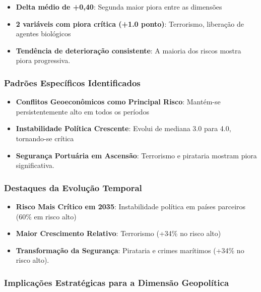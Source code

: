\documentclass[
  portuguese,
  letterpaper,
  DIV=11,
  numbers=noendperiod]{scrreprt}
\providecommand{\tightlist}{%
  \setlength{\itemsep}{0pt}\setlength{\parskip}{0pt}}
\begin{document}
\begin{itemize}
\tightlist
\item
  \textbf{Delta médio de +0,40}: Segunda maior piora entre as dimensões
\item
  \textbf{2 variáveis com piora crítica (+1.0 ponto)}: Terrorismo,
  liberação de agentes biológicos
\item
  \textbf{Tendência de deterioração consistente}: A maioria dos riscos
  mostra piora progressiva.
\end{itemize}

\subsubsection{Padrões Específicos
Identificados}\label{padruxf5es-especuxedficos-identificados-3}

\begin{itemize}
\tightlist
\item
  \textbf{Conflitos Geoeconômicos como Principal Risco}: Mantém-se
  persistentemente alto em todos os períodos
\item
  \textbf{Instabilidade Política Crescente}: Evolui de mediana 3.0 para
  4.0, tornando-se crítica
\item
  \textbf{Segurança Portuária em Ascensão}: Terrorismo e pirataria
  mostram piora significativa.
\end{itemize}

\subsubsection{Destaques da Evolução
Temporal}\label{destaques-da-evoluuxe7uxe3o-temporal-2}

\begin{itemize}
\tightlist
\item
  \textbf{Risco Mais Crítico em 2035}: Instabilidade política em países
  parceiros (60\% em risco alto)
\item
  \textbf{Maior Crescimento Relativo}: Terrorismo (+34\% no risco alto)
\item
  \textbf{Transformação da Segurança}: Pirataria e crimes marítimos
  (+34\% no risco alto).
\end{itemize}

\subsubsection{Implicações Estratégicas para a Dimensão
Geopolítica}\label{implicauxe7uxf5es-estratuxe9gicas-para-a-dimensuxe3o-geopoluxedtica}
\end{document}
